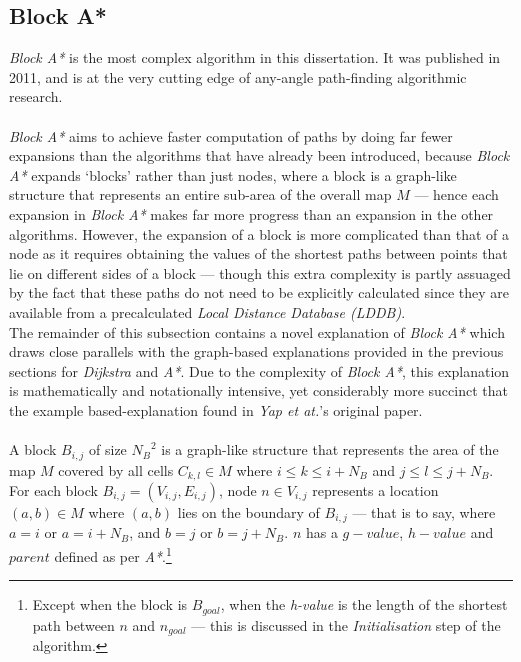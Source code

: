 \documentclass[12pt,notitlepage]{report}
\begin{document}
\subsection {Block A*}

\noindent
{\em Block A*} is the most complex algorithm in this dissertation. It was published in 2011, and is at the very cutting edge of any-angle path-finding algorithmic research.\\

\\
\noindent
{\em Block A*} aims to achieve faster computation of paths by doing far fewer expansions than the algorithms that have already been introduced, because {\em Block A*} expands `blocks' rather than just nodes, where a block is a graph-like structure that represents an entire sub-area of the overall map $M$ --- hence each expansion in {\em Block A*} makes far more progress than an expansion in the other algorithms. However, the expansion of a block is more complicated than that of a node as it requires obtaining the values of the shortest paths between points that lie on different sides of a block --- though this extra complexity is partly assuaged by the fact that these paths do not need to be explicitly calculated since they are available from a precalculated {\em Local Distance Database (LDDB)}.\\

\noindent
The remainder of this subsection contains a novel explanation of {\em Block A*} which draws close parallels with the graph-based explanations provided in the previous sections for {\em Dijkstra} and {\em A*}. Due to the complexity of {\em Block A*}, this explanation is mathematically and notationally intensive, yet considerably more succinct that the example based-explanation found in {\em Yap et at.}'s original paper\cite{Yap11}.\\

\\
\noindent
A block $B_{i,j}$ of size ${N_{B}}^{2}$ is a graph-like structure that represents the area of the map $M$ covered by all cells $C_{k,l} \in M$ where $i \leq k \leq i+N_{B}$ and $j \leq l \leq j+N_{B}$.\\

\noindent
For each block $B_{i,j} = (V_{i,j},E_{i,j})$, node $n \in V_{i,j}$ represents a location $(a,b) \in M$ where $(a,b)$ lies on the boundary of $B_{i,j}$ --- that is to say, where $a=i$ or $a=i+N_{B}$, and $b=j$ or $b=j+N_{B}$. $n$ has a $g-value$, $h-value$ and $parent$ defined as per {\em A*}.\footnote{Except when the block is $B_{goal}$, when the {\em h-value} is the length of the shortest path between $n$ and $n_{goal}$ --- this is discussed in the {\em Initialisation} step of the algorithm.}\\
\end{document}
